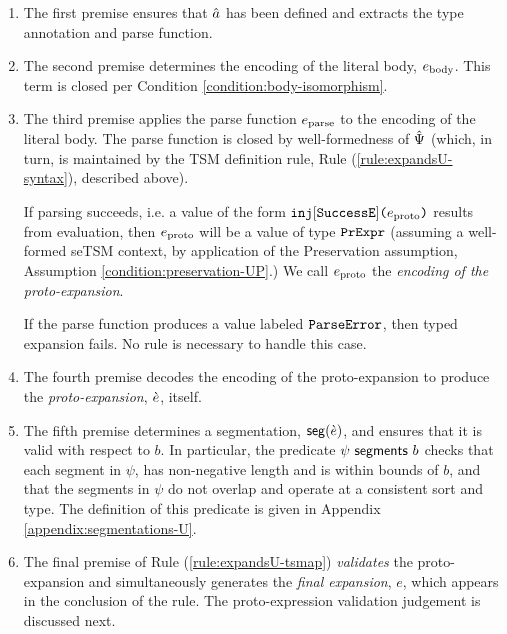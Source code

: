 \begin{enumerate}
\item The first premise ensures that $\hat{a}$ has been defined and extracts the type annotation and parse function.
\item The second premise determines the encoding of the literal body, $e_\text{body}$. This term is closed per Condition \ref{condition:body-isomorphism}.
\item The third premise applies the parse function $e_\text{parse}$ to the encoding of the literal body. The parse function is closed by well-formedness of $\hat{\Psi}$ (which, in turn, is maintained by the TSM definition rule, Rule (\ref{rule:expandsU-syntax}), described above). 

If parsing succeeds, i.e. a value of the form $\texttt{inj}[\mathtt{SuccessE}]\texttt{(}e_\text{proto}\texttt{)}$ results from evaluation, then $e_\text{proto}$ will be a value of type $\mathtt{PrExpr}$ (assuming a well-formed seTSM context, by application of the Preservation assumption, Assumption \ref{condition:preservation-UP}.) We call $e_\text{proto}$ the \emph{encoding of the proto-expansion}.

If the parse function produces a value labeled $\mathtt{ParseError}$, then typed expansion fails. No rule is necessary to handle this case. 

\item The fourth premise decodes the encoding of the proto-expansion to produce the \emph{proto-expansion}, $\grave{e}$, itself.

\item The fifth premise determines a segmentation, $\mathsf{seg}(\grave{e})$, and ensures that it is valid with respect to $b$. In particular, the predicate $\psi~\mathsf{segments}~b$ checks that each segment in $\psi$, has non-negative length and is within bounds of $b$, and that the segments in $\psi$ do not overlap and operate at a consistent sort and type. The definition of this predicate is given in Appendix \ref{appendix:segmentations-U}. 

\item The final premise of Rule (\ref{rule:expandsU-tsmap}) \emph{validates} the proto-expansion and simultaneously generates the \emph{final expansion}, $e$, which appears in the conclusion of the rule. The proto-expression validation judgement is discussed next.
\end{enumerate}
